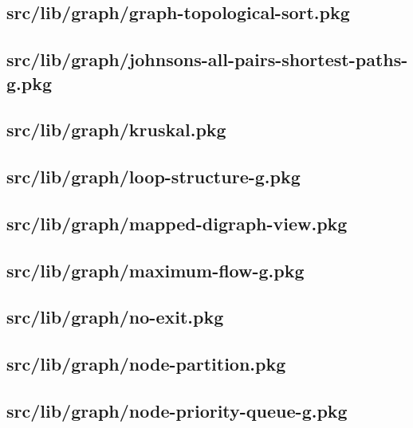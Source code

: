 \subsection{src/lib/graph/graph-topological-sort.pkg}


\subsection{src/lib/graph/johnsons-all-pairs-shortest-paths-g.pkg}


\subsection{src/lib/graph/kruskal.pkg}


\subsection{src/lib/graph/loop-structure-g.pkg}


\subsection{src/lib/graph/mapped-digraph-view.pkg}


\subsection{src/lib/graph/maximum-flow-g.pkg}


\subsection{src/lib/graph/no-exit.pkg}


\subsection{src/lib/graph/node-partition.pkg}


\subsection{src/lib/graph/node-priority-queue-g.pkg}


